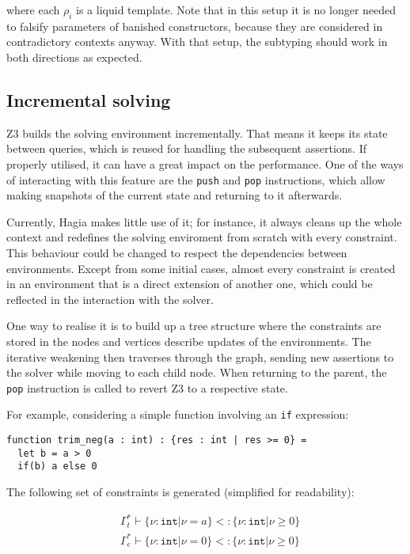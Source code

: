 where each $\rho_i$ is a liquid template. Note that in this setup it is no longer
needed to falsify parameters of banished constructors, because they are
considered in contradictory contexts anyway. With that setup, the subtyping
should work in both directions as expected.

\subsection{Incremental solving}

Z3 builds the solving environment incrementally. That means it keeps its state
between queries, which is reused for handling the subsequent assertions. If
properly utilised, it can have a great impact on the performance. One of the
ways of interacting with this feature are the \texttt{push} and \texttt{pop}
instructions, which allow making snapshots of the current state and returning to
it afterwards.

Currently, Hagia makes little use of it; for instance, it always cleans up the
whole context and redefines the solving enviroment from scratch with every
constraint. This behaviour could be changed to respect the dependencies between
environments. Except from some initial cases, almost every constraint is created
in an environment that is a direct extension of another one, which could be
reflected in the interaction with the solver.

One way to realise it is to build up a tree structure where the constraints are
stored in the nodes and vertices describe updates of the environments. The
iterative weakening then traverses through the graph, sending new assertions to
the solver while moving to each child node. When returning to the parent, the
\texttt{pop} instruction is called to revert Z3 to a respective state.

For example, considering a simple function involving an \texttt{if} expression:

\begin{lstlisting}[language=sophia]
function trim_neg(a : int) : {res : int | res >= 0} =
  let b = a > 0
  if(b) a else 0
\end{lstlisting}

The following set of constraints is generated (simplified for readability):

\begin{align*}
  & \Gamma^*_t \vdash \{\nu : \texttt{int} | \nu = a\} <: \{\nu : \texttt{int} | \nu
    \geq 0\}\\
  & \Gamma^*_e \vdash \{\nu : \texttt{int} | \nu = 0\} <: \{\nu : \texttt{int} | \nu
    \geq 0\}
\end{align*}

